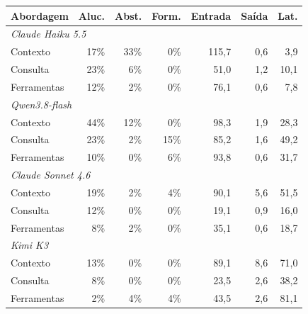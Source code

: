 \begin{tabular}{lrrrrrr}
\toprule
Abordagem & Aluc. & Abst. & Form. & Entrada & Saída & Lat. \\
\midrule
\multicolumn{7}{l}{\textit{Claude Haiku 5.5}} \\
Contexto & 17\% & 33\% & 0\% & 115,7 & 0,6 & 3,9 \\
Consulta & 23\% & 6\% & 0\% & 51,0 & 1,2 & 10,1 \\
Ferramentas & 12\% & 2\% & 0\% & 76,1 & 0,6 & 7,8 \\
\midrule
\multicolumn{7}{l}{\textit{Qwen3.8-flash}} \\
Contexto & 44\% & 12\% & 0\% & 98,3 & 1,9 & 28,3 \\
Consulta & 23\% & 2\% & 15\% & 85,2 & 1,6 & 49,2 \\
Ferramentas & 10\% & 0\% & 6\% & 93,8 & 0,6 & 31,7 \\
\midrule
\multicolumn{7}{l}{\textit{Claude Sonnet 4.6}} \\
Contexto & 19\% & 2\% & 4\% & 90,1 & 5,6 & 51,5 \\
Consulta & 12\% & 0\% & 0\% & 19,1 & 0,9 & 16,0 \\
Ferramentas & 8\% & 2\% & 0\% & 35,1 & 0,6 & 18,7 \\
\midrule
\multicolumn{7}{l}{\textit{Kimi K3}} \\
Contexto & 13\% & 0\% & 0\% & 89,1 & 8,6 & 71,0 \\
Consulta & 8\% & 0\% & 0\% & 23,5 & 2,6 & 38,2 \\
Ferramentas & 2\% & 4\% & 4\% & 43,5 & 2,6 & 81,1 \\
\bottomrule
\end{tabular}
